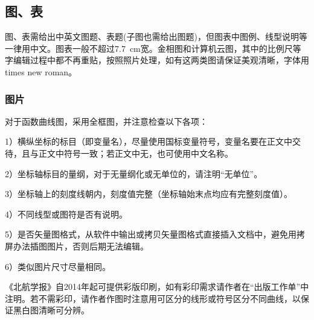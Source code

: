 \documentclass[10.5pt,twocolumn]{jbuaa}
\begin{document}
\subsection{图、表}
图、表需给出中英文图题、表题(子图也需给出图题)，但图表中图例、线型说明等一律用中文。图表一般不超过7.7\ cm宽。金相图和计算机云图，其中的比例尺等字编辑过程中都不再重贴，按照照片处理，如有这两类图请保证美观清晰，字体用times new roman。

\subsubsection{图片}
对于函数曲线图，采用全框图，并注意检查以下各项：

1）横纵坐标的标目（即变量名），尽量使用国标变量符号，变量名要在正文中交待，且与正文中符号一致；若正文中无，也可使用中文名称。

2）坐标轴标目的量纲，对于无量纲化或无单位的，请注明``无单位”。

3）坐标轴上的刻度线朝内，刻度值完整（坐标轴始末点均应有完整刻度值）。

4）不同线型或图符是否有说明。

5）是否矢量图格式，从软件中输出或拷贝矢量图格式直接插入文档中，避免用拷屏办法插图图片，否则后期无法编辑。

6）类似图片尺寸尽量相同。

《北航学报》自2014年起可提供彩版印刷，如有彩印需求请作者在“出版工作单”中注明。若不需彩印，请作者作图时注意用可区分的线形或符号区分不同曲线，以保证黑白图清晰可分辨。 
\end{document}
